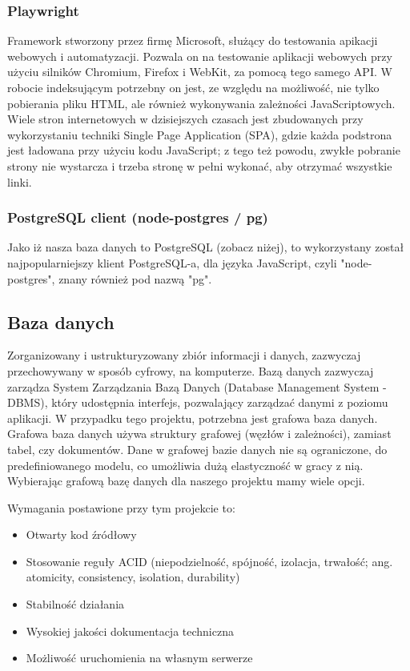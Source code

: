\documentclass[a4paper, 12pt]{article}
\begin{document}
\subsubsection{Playwright}
Framework stworzony przez firmę Microsoft, służący do testowania apikacji webowych i automatyzacji. Pozwala on na testowanie aplikacji webowych przy użyciu silników Chromium, Firefox i WebKit, za pomocą tego samego API.\cite{playwrightReadme} W robocie indeksującym potrzebny on jest, ze względu na możliwość, nie tylko pobierania pliku HTML, ale również wykonywania zależności JavaScriptowych. Wiele stron internetowych w dzisiejszych czasach jest zbudowanych przy wykorzystaniu techniki Single Page Application (SPA), gdzie każda podstrona jest ładowana przy użyciu kodu JavaScript\cite{jsSpaOreilly}; z tego też powodu, zwykłe pobranie strony nie wystarcza i trzeba stronę w pełni wykonać, aby otrzymać wszystkie linki.
\subsubsection{PostgreSQL client (node-postgres / pg)}
Jako iż nasza baza danych to PostgreSQL (zobacz niżej), to wykorzystany został najpopularniejszy klient PostgreSQL-a, dla języka JavaScript, czyli "node-postgres", znany również pod nazwą "pg".
\subsection{Baza danych}
Zorganizowany i ustrukturyzowany zbiór informacji i danych, zazwyczaj przechowywany w sposób cyfrowy, na komputerze. Bazą danych zazwyczaj zarządza System Zarządzania Bazą Danych (Database Management System - DBMS), który udostępnia interfejs, pozwalający zarządzać danymi z poziomu aplikacji.\cite{oracleDatabase} W przypadku tego projektu, potrzebna jest grafowa baza danych. Grafowa baza danych używa struktury grafowej (węzłów i zależności), zamiast tabel, czy dokumentów. Dane w grafowej bazie danych nie są ograniczone, do predefiniowanego modelu, co umożliwia dużą elastyczność w gracy z nią.\cite{neo4jGraphDB} Wybierając grafową bazę danych dla naszego projektu mamy wiele opcji.

Wymagania postawione przy tym projekcie to:
\begin{itemize}
	\item Otwarty kod źródłowy
	\item Stosowanie reguły ACID (niepodzielność, spójność, izolacja, trwałość; ang. atomicity, consistency, isolation, durability)
	\item Stabilność działania
	\item Wysokiej jakości dokumentacja techniczna
	\item Możliwość uruchomienia na własnym serwerze
\end{itemize}
\end{document}
